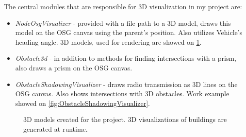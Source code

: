 \documentclass[]{nsm-thesis}
\begin{document}
The central modules that are responsible for 3D visualization in my project are: 

\begin{itemize}

\item \emph{NodeOsgVisualizer} - provided with a file path to a 3D model, draws this model on the \ac{OSG} canvas using the parent's position. Also utilizes Vehicle's heading angle. 3D-models, used for rendering are showed on \cref{fig:3dmodels}.

\item \emph{Obstacle3d} - in addition to methods for finding intersections with a prism, also draws a prism on the \ac{OSG} canvas.

\item \emph{ObstacleShadowingVisualizer} - draws radio transmission as 3D lines on the \ac{OSG} canvas. Also shows intersections with 3D obstacles.  Work example showed on \cref{fig:ObstacleShadowingVisualizer}.

\end{itemize}

\begin{figure}%
    \centering
    \caption{3D models created for the project. 3D visualizations of buildings are generated at runtime.}%
    \label{fig:3dmodels}%
\end{figure}
\end{document}
